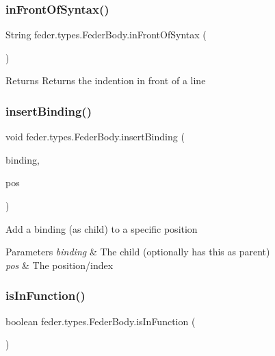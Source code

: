 \subsubsection{\texorpdfstring{in\+Front\+Of\+Syntax()}{inFrontOfSyntax()}}
{\footnotesize\ttfamily String feder.\+types.\+Feder\+Body.\+in\+Front\+Of\+Syntax (\begin{DoxyParamCaption}{ }\end{DoxyParamCaption})}

\begin{DoxyReturn}{Returns}
Returns the indention in front of a line 
\end{DoxyReturn}
\mbox{\label{classfeder_1_1types_1_1FederBody_a7651c132103a25c4450ccdc3de8df2a3}} 
\subsubsection{\texorpdfstring{insert\+Binding()}{insertBinding()}}
{\footnotesize\ttfamily void feder.\+types.\+Feder\+Body.\+insert\+Binding (\begin{DoxyParamCaption}\item[{\hyperlink{classfeder_1_1types_1_1FederBinding}{Feder\+Binding}}]{binding,  }\item[{int}]{pos }\end{DoxyParamCaption})}

Add a binding (as child) to a specific position 
\begin{DoxyParams}{Parameters}
{\em binding} & The child (optionally has this as parent) \\
\hline
{\em pos} & The position/index \\
\hline
\end{DoxyParams}
\mbox{\label{classfeder_1_1types_1_1FederBody_ab3f37b7b8ea9806ea13856f993e11902}} 
\subsubsection{\texorpdfstring{is\+In\+Function()}{isInFunction()}}
{\footnotesize\ttfamily boolean feder.\+types.\+Feder\+Body.\+is\+In\+Function (\begin{DoxyParamCaption}{ }\end{DoxyParamCaption})}

